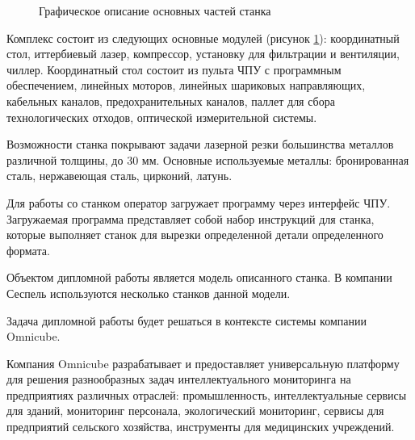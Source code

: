 \begin{figure}[h]
    \caption{Графическое описание основных частей станка}
    \label{modules}
\end{figure}

Комплекс состоит из следующих основные модулей (рисунок \ref{modules}):
координатный стол, иттербиевый лазер, компрессор, установку для фильтрации и вентиляции, чиллер.
Координатный стол состоит из пульта ЧПУ с программным обеспечением,
линейных моторов, линейных шариковых направляющих,
кабельных каналов, предохранительных каналов,
паллет для сбора технологических отходов,
оптической измерительной системы.

Возможности станка покрывают задачи лазерной резки большинства металлов различной толщины, до 30 мм.
Основные используемые металлы: бронированная сталь, нержавеющая сталь, цирконий, латунь.

Для работы со станком оператор загружает программу через интерфейс ЧПУ.
Загружаемая программа представляет собой набор инструкций для станка,
которые выполняет станок для вырезки определенной детали определенного формата.

Объектом дипломной работы является модель описанного станка.
В компании Сеспель используются несколько станков данной модели.

Задача дипломной работы будет решаться в контексте
системы компании Omnicube.

Компания Omnicube разрабатывает и предоставляет универсальную платформу
для решения разнообразных задач интеллектуального мониторинга
на предприятиях различных отраслей: промышленность,
интеллектуальные сервисы для зданий, мониторинг персонала,
экологический мониторинг, сервисы для предприятий сельского хозяйства,
инструменты для медицинских учреждений. \cite{omnicube}


